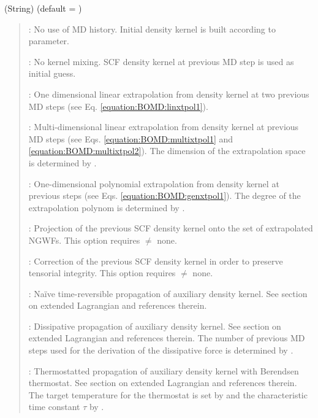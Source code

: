 \documentclass[letterpaper,10pt,english]{sphinxmanual}
\begin{document}
 (String) (default = )
\begin{quote}

\begin{DUlineblock}{0em}
\item[]  : No use of MD history. Initial density kernel is built according to  parameter.
\item[]  : No kernel mixing. SCF density kernel at previous MD step is used as initial guess.
\item[]  : One dimensional linear extrapolation from density kernel at two previous MD steps (see Eq. \eqref{equation:BOMD:linxtpol1}).
\item[]  : Multi-dimensional linear extrapolation from density kernel at previous MD steps (see Eqs. \eqref{equation:BOMD:multixtpol1} and \eqref{equation:BOMD:multixtpol2}). The dimension of the extrapolation space is determined by .
\item[]  : One-dimensional polynomial extrapolation from density kernel at previous steps (see Eqs. \eqref{equation:BOMD:genxtpol1}). The degree of the extrapolation polynom is determined by .
\item[]  : Projection of the previous SCF density kernel onto the set of extrapolated NGWFs. This option requires  \(\neq\) none.
\item[]  : Correction of the previous SCF density kernel in order to preserve tensorial integrity. This option requires  \(\neq\) none.
\item[]  : Naïve time-reversible propagation of auxiliary density kernel. See section on extended Lagrangian and references therein.
\item[]  : Dissipative propagation of auxiliary density kernel. See section on extended Lagrangian and references therein. The number of previous MD steps used for the derivation of the dissipative force is determined by .
\item[]  : Thermostatted propagation of auxiliary density kernel with Berendsen thermostat. See section on extended Lagrangian and references therein. The target temperature for the thermostat is set by  and the characteristic time constant \(\tau\) by .
\end{DUlineblock}
\end{quote}
\end{document}
